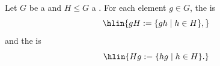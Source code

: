 \begin{definition}[Cosets] \label{definition:coset_of_a_subgroup_of_a_group_by_an_element}
Let $G$ be a  and $H \le G$ a .  
For each element $g \in G$, the  is
$$\hlin{gH := \{gh \mid h \in H\},}$$
and the  is
$$\hlin{Hg := \{hg \mid h \in H\}.}$$
\end{definition}